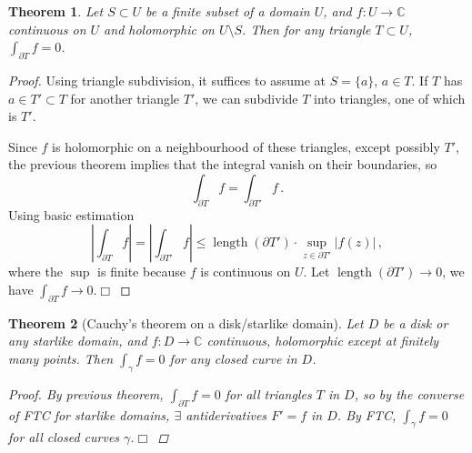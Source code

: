 \documentclass{article}
\theoremstyle{plain}\theoremheaderfont{\normalfont\itshape}\theorembodyfont{\rmfamily}\theoremseparator{.}\newtheorem*{rem}{Remark}\newtheorem*{ex}{Example}\newtheorem*{proof}{Proof}\newtheorem*{altp}{Alternative proof}\newtheorem*{con}{Consequences}\newtheorem*{notn}{Notations}\newtheorem*{cau}{Caution}\newtheorem*{term}{Terminology}\newtheorem*{keyex}{Key example}
\theoremstyle{plain}\theoremheaderfont{\normalfont\bfseries}\theorembodyfont{\rmfamily}\theoremseparator{.}\newtheorem{thm}{Theorem}[section]\newtheorem{lem}[thm]{Lemma}\newtheorem{prop}[thm]{Proposition}\newtheorem*{cor}{Corollary}\newtheorem{defn}[thm]{Definition}\newtheorem{clm}[thm]{Claim}\newtheorem{clminproof}{Claim}\newtheorem{leminproof}{Lemma}\newtheorem{app}{Application}
\theoremstyle{break}\theoremheaderfont{\normalfont\itshape}\theorembodyfont{\rmfamily}\theoremseparator{.\medskip}\newtheorem*{proofskip}{Proof}\newtheorem*{exs}{Examples}\newtheorem*{rems}{Remarks}\newtheorem*{rec}{Recall}\newtheorem*{ppts}{Properties}
\theoremstyle{break}\theoremheaderfont{\normalfont\bfseries}\theorembodyfont{\rmfamily}\theoremseparator{.\medskip}\newtheorem{lemskip}[thm]{Lemma}\newtheorem{defnskip}[thm]{Definition}\newtheorem{propskip}[thm]{Proposition}\newtheorem{thmskip}[thm]{Theorem}
\numberwithin{equation}{section}
\DeclareMathOperator*{\length}{length}
\newcommand{\qed}{\hfill\ensuremath{\Box}}
\newcommand{\abs}[1]{\left|#1\right|}
\newcommand{\CC}{\mathbb{C}}
\begin{document}
    \begin{thm}
        Let \(S\subset U\) be a finite subset of a domain \(U\), and \(f:U\to\CC\) continuous on \(U\) and holomorphic on \(U\setminus S\). Then for any triangle \(T\subset U\), \(\int_{\partial T}f=0\).
    \end{thm}
    \begin{proof}
        Using triangle subdivision, it suffices to assume at \(S=\{a\}\), \(a\in T\). If \(T\) has \(a\in T'\subset T\) for another triangle \(T'\), we can subdivide \(T\) into triangles, one of which is \(T'\).
        \begin{figure}[ht!]
            \centering
        \end{figure}

        Since \(f\) is holomorphic on a neighbourhood of these triangles, except possibly \(T'\), the previous theorem implies that the integral vanish on their boundaries, so
        \[\int_{\partial T}f=\int_{\partial T'}f\,.\]
        Using basic estimation
        \[\abs{\int_{\partial T}f}=\abs{\int_{\partial T'}f}\le\length(\partial T')\cdot\sup_{z\in\partial T'}\abs{f(z)}\,,\]
        where the \(\sup\) is finite because \(f\) is continuous on \(U\). Let \(\length(\partial T')\to 0\), we have \(\int_{\partial T}f\to 0\).\qed
    \end{proof}
    \begin{thm}[Cauchy's theorem on a disk/starlike domain]
        Let \(D\) be a disk or any starlike domain, and \(f:D\to\CC\) continuous, holomorphic except at finitely many points. Then \(\int_{\gamma}f=0\) for any closed curve in \(D\).
        \begin{proof}
            By previous theorem, \(\int_{\partial T}f=0\) for all triangles \(T\) in \(D\), so by the converse of FTC for starlike domains, \(\exists\) antiderivatives \(F'=f\) in \(D\). By FTC, \(\int_\gamma f=0\) for all closed curves \(\gamma\).\qed
        \end{proof}
    \end{thm}
\end{document}
